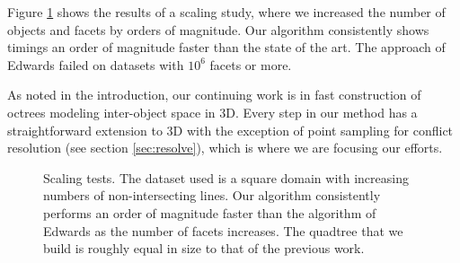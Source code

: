 \documentclass[final,3p,times,twocolumn]{elsarticle}
\begin{document}
Figure \ref{fig:timings} shows the results of a scaling study, where we increased the number of objects and facets by orders of magnitude. Our algorithm consistently shows timings an order of magnitude faster than the state of the art. The approach of Edwards \etal failed on datasets with $10^6$ facets or more.

As noted in the introduction, our continuing work is in fast construction of octrees modeling inter-object space in 3D.
Every step in our method has a straightforward extension to 3D with the exception of point sampling for conflict resolution (see section \ref{sec:resolve}), which is where we are focusing our efforts.

\begin{figure}
  \centering
  \caption{Scaling tests. The dataset used is a square domain with increasing numbers of non-intersecting lines.
    \protect{} Our algorithm consistently performs an order of magnitude faster than the algorithm of Edwards \etal \cite{edwards2015approximating} as the number of facets increases.
    \protect{} The quadtree that we build is roughly equal in size to that of the previous work.
  }
  \label{fig:timings}
\end{figure}

\end{document}
